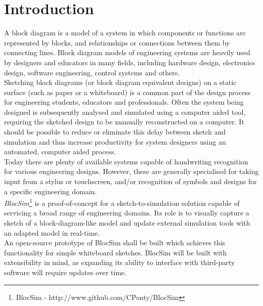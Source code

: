 \mainmatter


\chapter{Introduction}

A block diagram is a model of a system in which components or functions are represented by blocks, and relationships or connections between them by connecting lines. Block diagram models of engineering systems are heavily used by designers and educators in many fields, including hardware design, electronics design, software engineering, control systems and others.
\\

Sketching block diagrams (or block diagram equivalent designs) on a static surface (such as paper or a whiteboard) is a common part of the design process for engineering students, educators and professionals. Often the system being designed is subsequently analysed and simulated using a computer aided tool, requiring the sketched design to be manually reconstructed on a computer. It should be possible to reduce or eliminate this delay between sketch and simulation and thus increase productivity for system designers using an automated, computer aided process.
\\

Today there are plenty of available systems capable of handwriting recognition for various engineering designs. However, these are generally specialised for taking input from a stylus or touchscreen, and/or recognition of symbols and designs for a specific engineering domain.
\\

\textit{BlocSim}\footnote{BlocSim - http://www.github.com/CPonty/BlocSim} is a proof-of-concept for a sketch-to-simulation solution capable of servicing a broad range of engineering domains. Its role is to visually capture a sketch of a block-diagram-like model and update external simulation tools with an adapted model in real-time. 
\\

An open-source prototype of BlocSim shall be built which achieves this functionality for simple whiteboard sketches. BlocSim will be built with extensibility in mind, as expanding its ability to interface with third-party software will require updates over time.


\begin{comment}

\end{comment}

